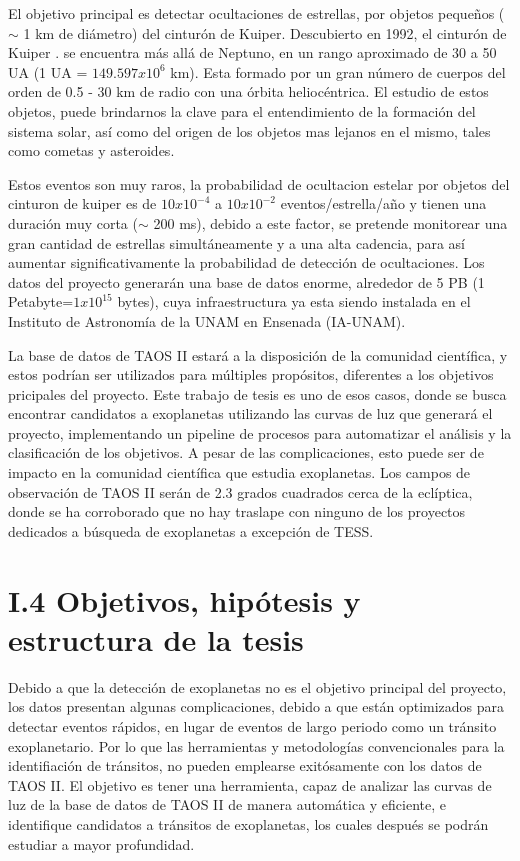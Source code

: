El objetivo principal es detectar ocultaciones de estrellas, por objetos pequeños ($\sim$ 1 km de diámetro) del cinturón de Kuiper. Descubierto en 1992, el cinturón de Kuiper \cite{luu2002kuiper}. se encuentra más allá de Neptuno, en un rango aproximado de 30 a 50 UA (1 UA = $ 149.597x10^{6}$ km). Esta formado por un gran número de cuerpos del orden de 0.5 - 30 km de radio con una órbita heliocéntrica. El estudio de estos objetos, puede brindarnos la clave para el entendimiento de la formación del sistema solar, así como del origen de los objetos mas lejanos en el mismo, tales como cometas y asteroides.

Estos eventos son muy raros, la probabilidad de ocultacion estelar por objetos del cinturon de kuiper es de $10x10^{-4}$ a $10x10^{-2}$ eventos/estrella/año y tienen una duración muy corta ($\sim$ 200 ms), debido a este factor, se pretende monitorear una gran cantidad de estrellas simultáneamente y a una alta cadencia, para así aumentar significativamente la probabilidad de detección de ocultaciones. Los datos del proyecto generarán una base de datos enorme, alrededor de 5 PB (1 Petabyte=$ 1x10^{15}$ bytes), cuya infraestructura ya esta siendo instalada en el Instituto de Astronomía de la UNAM en Ensenada (IA-UNAM). 

La base de datos de TAOS II estará a la disposición de la comunidad científica, y estos podrían ser utilizados para múltiples propósitos, diferentes a los objetivos pricipales del proyecto. Este trabajo de tesis es uno de esos casos, donde se busca encontrar candidatos a exoplanetas utilizando las curvas de luz que generará el proyecto, implementando un pipeline de procesos para automatizar el análisis y la clasificación de los objetivos. A pesar de las complicaciones, esto puede ser de impacto en la comunidad científica que estudia exoplanetas. Los campos de observación de TAOS II serán de 2.3 grados cuadrados cerca de la eclíptica, donde se ha corroborado que no hay traslape con ninguno de los proyectos dedicados a búsqueda de exoplanetas a excepción de TESS.


\section*{I.4 Objetivos, hipótesis y estructura de la tesis}


Debido a que la detección de exoplanetas no es el objetivo principal del proyecto, los datos presentan algunas complicaciones, debido a que están optimizados para detectar eventos rápidos, en lugar de eventos de largo periodo como un tránsito exoplanetario. Por lo que las herramientas y metodologías convencionales para la identifiación de tránsitos, no pueden emplearse exitósamente con los datos de TAOS II. El objetivo es tener una herramienta, capaz de analizar las curvas de luz de la base de datos de TAOS II de manera automática y eficiente, e identifique candidatos a tránsitos de exoplanetas, los cuales después se podrán estudiar a mayor profundidad.

